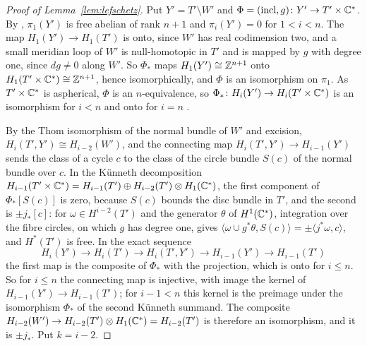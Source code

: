 \begin{proof}[Proof of Lemma~\ref{lem:lefschetz}]
Put $Y'=T'\setminus W'$ and $\Phi=(\mathrm{incl},g)\colon Y'\to T'\times\mathbb C^*$. By \cite[Thm.~(5.3)(ii)]{Oka80},
$\pi_1(Y')$ is free abelian of rank $n+1$ and $\pi_i(Y')=0$ for $1<i<n$. The map $H_1(Y')\to H_1(T')$ is onto, since $W'$
has real codimension two, and a small meridian loop of $W'$ is null-homotopic in $T'$ and is mapped by $g$ with degree
one, since $dg\ne0$ along $W'$. So $\Phi_*$ maps $H_1(Y')\cong\mathbb Z^{n+1}$ onto $H_1(T'\times\mathbb C^*)\cong\mathbb Z^{n+1}$, hence
isomorphically, and $\Phi$ is an isomorphism on $\pi_1$. As $T'\times\mathbb C^*$ is aspherical, $\Phi$ is an $n$-equivalence,
so $\Phi_*\colon H_i(Y')\to H_i(T'\times\mathbb C^*)$ is an isomorphism for $i<n$ and onto for $i=n$ \cite[proof of
Prop.~4.21]{Hat02}.

By the Thom isomorphism of the normal bundle of $W'$ and excision, $H_i(T',Y')\cong H_{i-2}(W')$, and the connecting
map $H_i(T',Y')\to H_{i-1}(Y')$ sends the class of a cycle $c$ to the class of the circle bundle $S(c)$ of the normal
bundle over $c$. In the Künneth decomposition
$H_{i-1}(T'\times\mathbb C^*)=H_{i-1}(T')\oplus H_{i-2}(T')\otimes H_1(\mathbb C^*)$, the first component of $\Phi_*[S(c)]$ is zero,
because $S(c)$ bounds the disc bundle in $T'$, and the second is $\pm j_*[c]$: for $\omega\in H^{i-2}(T')$ and the
generator $\theta$ of $H^1(\mathbb C^*)$, integration over the fibre circles, on which $g$ has degree one, gives
$\langle\omega\cup g^*\theta,S(c)\rangle=\pm\langle j^*\omega,c\rangle$, and $H^*(T')$ is free. In the exact sequence
\[
H_i(Y')\to H_i(T')\to H_i(T',Y')\to H_{i-1}(Y')\to H_{i-1}(T')
\]
the first map is the composite of $\Phi_*$ with the projection, which is onto for $i\le n$. So for $i\le n$ the
connecting map is injective, with image the kernel of $H_{i-1}(Y')\to H_{i-1}(T')$; for $i-1<n$ this kernel is the
preimage under the isomorphism $\Phi_*$ of the second Künneth summand. The composite
$H_{i-2}(W')\to H_{i-2}(T')\otimes H_1(\mathbb C^*)=H_{i-2}(T')$ is therefore an isomorphism, and it is $\pm j_*$. Put
$k=i-2$.
\end{proof}

